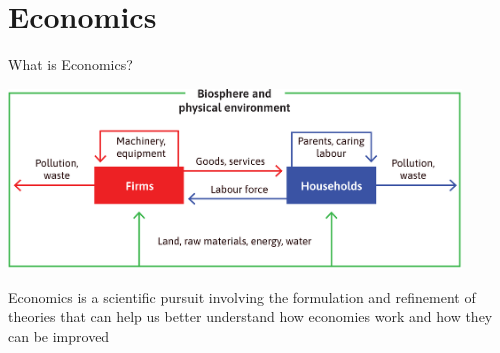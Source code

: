 \documentclass[11pt,aspectratio=43,usenames,dvipsnames]{beamer}
\theoremstyle{definition}
\begin{document}
\section{Economics}
\label{sec:Economics}

\begin{frame}{What is Economics?}
\label{slide:What_is_Economics_}
    \begin{center}
        \includegraphics[width=0.9\textwidth]{./figures/Figure1_15.png}
    \end{center}
    Economics is a \alert{scientific pursuit} involving the formulation and \alert{refinement of theories} that can help us better understand \alert{how economies work} and \alert{how they can be improved}
\end{frame}
\end{document}
